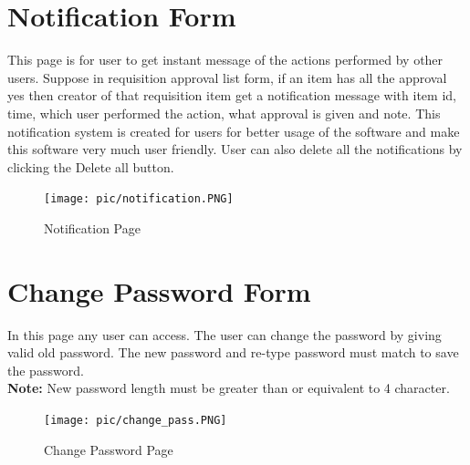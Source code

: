\documentclass[12pt]{report} %
\begin{document}
\section{Notification Form}
This page is for user to get instant message of the actions performed by other users. Suppose in requisition approval list form, if an item has all the approval yes then creator of that requisition item get a notification message with item id, time, which user performed the action, what approval is given and note. This notification system is created for users for better usage of the software and make this software very much user friendly. User can also delete all the notifications by clicking the Delete all button.
\begin{figure}[h]
	\texttt{[image: pic/notification.PNG]}
	\caption{Notification Page}
	\label{fig:notification}
\end{figure}


\section{Change Password Form}
In this page any user can access. The user can change the password by giving valid old password. The new password and re-type password must match to save the password. \\
\textbf{Note:} New password length must be greater than or equivalent to 4 character.\\
\begin{figure}[h]
	\begin{center}
	\texttt{[image: pic/change\_pass.PNG]}
	\end{center}
	\caption{Change Password Page}
	\label{fig:change_pass}
\end{figure}



\clearpage










\ifx
\end{document}
